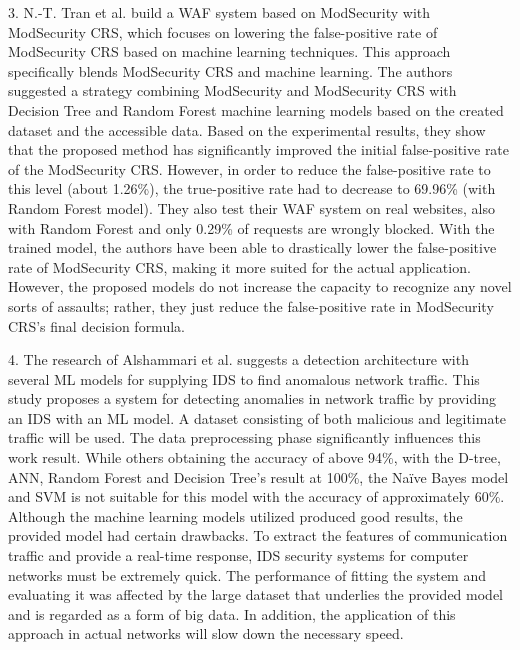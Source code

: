 3.	N.-T. Tran et al. \cite{Tin} build a WAF system based on ModSecurity with ModSecurity CRS, which focuses on lowering the false-positive rate of ModSecurity CRS based on machine learning techniques. This approach specifically blends ModSecurity CRS and machine learning. The authors suggested a strategy combining ModSecurity and ModSecurity CRS with Decision Tree and Random Forest machine learning models based on the created dataset and the accessible data. Based on the experimental results, they show that the proposed method has signiﬁcantly improved the initial false-positive rate of the ModSecurity CRS. However, in order to reduce the false-positive rate to this level (about 1.26\%), the true-positive rate had to decrease to 69.96\% (with Random Forest model). They also test their WAF system on real websites, also with Random Forest and only 0.29\% of requests are wrongly blocked. With the trained model, the authors have been able to drastically lower the false-positive rate of ModSecurity CRS, making it more suited for the actual application. However, the proposed models do not increase the capacity to recognize any novel sorts of assaults; rather, they just reduce the false-positive rate in ModSecurity CRS's final decision formula.

4.	The research of Alshammari et al.\cite{Alshammari} suggests a detection architecture with several ML models for supplying IDS to find anomalous network traffic. This study proposes a system for detecting anomalies in network traffic by providing an IDS with an ML model. A dataset consisting of both malicious and legitimate traffic will be used. The data preprocessing phase significantly influences this work result. While others obtaining the accuracy of above 94\%, with the D-tree, ANN, Random Forest and Decision Tree's result at 100\%, the Naïve Bayes model and SVM is not suitable for this model with the accuracy of approximately 60\%. Although the machine learning models utilized produced good results, the provided model had certain drawbacks. To extract the features of communication traffic and provide a real-time response, IDS security systems for computer networks must be extremely quick. The performance of fitting the system and evaluating it was affected by the large dataset that underlies the provided model and is regarded as a form of big data. In addition, the application of this approach in actual networks will slow down the necessary speed.

